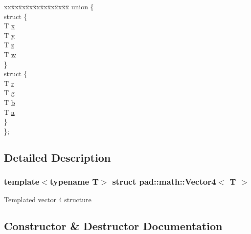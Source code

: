 \begin{DoxyCompactItemize}
\begin{tabbing}
\end{tabbing}\item 
\begin{tabbing}
xx\=xx\=xx\=xx\=xx\=xx\=xx\=xx\=xx\=\kill
union \{\\
\>struct \{\\
\>\>T \mbox{\hyperlink{structpad_1_1math_1_1_vector4_a977619c0dbd2e7060bb1f839d3fa8337}{x}}\\
\>\>T \mbox{\hyperlink{structpad_1_1math_1_1_vector4_a2461711530968b1c7c5ff1256a5a6098}{y}}\\
\>\>T \mbox{\hyperlink{structpad_1_1math_1_1_vector4_a9407faaccb5b094aeb3cadc36e71755e}{z}}\\
\>\>T \mbox{\hyperlink{structpad_1_1math_1_1_vector4_abbbd617d5083a886936724282216bee4}{w}}\\
\>\} \\
\>struct \{\\
\>\>T \mbox{\hyperlink{structpad_1_1math_1_1_vector4_a2288e82eaf6dd6c283f4714503b13096}{r}}\\
\>\>T \mbox{\hyperlink{structpad_1_1math_1_1_vector4_ac4a05c791e0522930bed20045239e870}{g}}\\
\>\>T \mbox{\hyperlink{structpad_1_1math_1_1_vector4_a00d2630fa1befcfa4c343e2f4187ec71}{b}}\\
\>\>T \mbox{\hyperlink{structpad_1_1math_1_1_vector4_afb5d50917f750bbe417871b7f290b10c}{a}}\\
\>\} \\
\}; \\

\end{tabbing}\end{DoxyCompactItemize}


\subsection{Detailed Description}
\subsubsection*{template$<$typename T$>$\newline
struct pad\+::math\+::\+Vector4$<$ T $>$}

Templated vector 4 structure 

\subsection{Constructor \& Destructor Documentation}
\mbox{\label{structpad_1_1math_1_1_vector4_a685f645bb73f9e7e2f0cfad10f8c9b3b}} 
